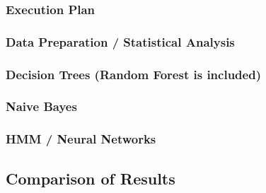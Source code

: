 \subsubsection{Execution Plan}
\subsubsection{Data Preparation / Statistical Analysis}
\label{subsubsec:data_preparation}
\subsubsection{Decision Trees (Random Forest is included)}
\subsubsection{Naive Bayes}
\subsubsection{HMM / Neural Networks}

\subsection{Comparison of Results}
